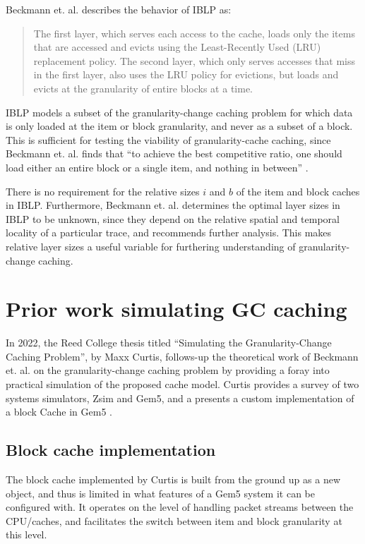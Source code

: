 \documentclass[12pt,twoside]{reedthesis}
\begin{document}
	Beckmann et. al. describes the behavior of IBLP as: \begin{quote}
		The first layer, which serves each access to the cache, loads only the items that are accessed and evicts using the Least-Recently Used (LRU) replacement policy. The second layer, which only serves accesses that miss in the first layer, also uses the LRU policy for evictions, but loads and evicts at the granularity of entire blocks at a time. \cite{beckmann}
	\end{quote}
 
	IBLP models a subset of the granularity-change caching problem for which data is only loaded at the item or block granularity, and never as a subset of a block. This is sufficient for testing the viability of granularity-cache caching, since Beckmann et. al. finds that ``to achieve the best competitive ratio, one should load either an entire block or a single item, and nothing in between'' \cite{beckmann}.
	
	There is no requirement for the relative sizes $i$ and $b$ of the item and block caches in IBLP. Furthermore, Beckmann et. al. determines the optimal layer sizes in IBLP to be unknown, since they depend on the relative spatial and temporal locality of a particular trace, and recommends further analysis. This makes relative layer sizes a useful variable for furthering understanding of granularity-change caching.


\section{Prior work simulating GC caching}

In 2022, the Reed College thesis titled ``Simulating the Granularity-Change Caching Problem'', by Maxx Curtis, follows-up the theoretical work of Beckmann et. al. on the granularity-change caching problem by providing a foray into practical simulation of the proposed cache model. Curtis provides a survey of two systems simulators, Zsim and Gem5, and a presents a custom implementation of a block Cache in Gem5 \cite{curtis}.

	\subsection*{Block cache implementation}

	The block cache implemented by Curtis is built from the ground up as a new object, and thus is limited in what features of a Gem5 system it can be configured with. It operates on the level of handling packet streams between the CPU/caches, and facilitates the switch between item and block granularity at this level. 
\end{document}
